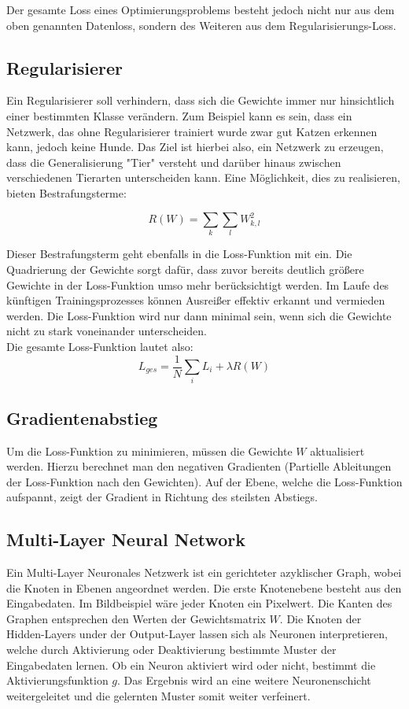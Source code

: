 \documentclass[11pt,ceqn]{book}
\begin{document}
Der gesamte Loss eines Optimierungsproblems besteht jedoch nicht nur aus dem oben genannten Datenloss, sondern des Weiteren aus dem Regularisierungs-Loss.

\subsection{Regularisierer}
Ein Regularisierer soll verhindern, dass sich die Gewichte immer nur hinsichtlich einer bestimmten Klasse verändern. Zum Beispiel kann es sein, dass ein Netzwerk, das ohne Regularisierer trainiert wurde zwar gut Katzen erkennen kann, jedoch keine Hunde. Das Ziel ist hierbei also, ein Netzwerk zu erzeugen, dass die Generalisierung "Tier" versteht und darüber hinaus zwischen verschiedenen Tierarten unterscheiden kann. Eine Möglichkeit, dies zu realisieren, bieten Bestrafungsterme:

\[R(W) = \sum_{k}\sum_{l} W_{k,l}^2\]

Dieser Bestrafungsterm geht ebenfalls in die Loss-Funktion mit ein. Die Quadrierung der Gewichte sorgt dafür, dass zuvor bereits deutlich größere Gewichte in der Loss-Funktion umso mehr berücksichtigt werden. Im Laufe des künftigen Trainingsprozesses können Ausreißer effektiv erkannt und vermieden werden. Die Loss-Funktion wird nur dann minimal sein, wenn sich die Gewichte nicht zu stark voneinander unterscheiden.
\\
Die gesamte Loss-Funktion lautet also:
\[L_{ges} = \frac{1}{N} \sum_{i} L_i + \lambda R(W)\]

\subsection{Gradientenabstieg}
Um die Loss-Funktion zu minimieren, müssen die Gewichte $W$ aktualisiert werden. Hierzu berechnet man den negativen Gradienten (Partielle Ableitungen der Loss-Funktion nach den Gewichten). Auf der Ebene, welche die Loss-Funktion aufspannt, zeigt der Gradient in Richtung des steilsten Abstiegs.


\subsection{Multi-Layer Neural Network}
Ein Multi-Layer Neuronales Netzwerk ist ein gerichteter azyklischer Graph, wobei die Knoten in Ebenen angeordnet werden. Die erste Knotenebene besteht aus den Eingabedaten. Im Bildbeispiel wäre jeder Knoten ein Pixelwert. Die Kanten des Graphen entsprechen den Werten der Gewichtsmatrix $W$. Die Knoten der Hidden-Layers under der Output-Layer lassen sich als Neuronen interpretieren, welche durch Aktivierung oder Deaktivierung bestimmte Muster der Eingabedaten lernen. Ob ein Neuron aktiviert wird oder nicht, bestimmt die Aktivierungsfunktion $g$. Das Ergebnis wird an eine weitere Neuronenschicht weitergeleitet und die gelernten Muster somit weiter verfeinert.
\end{document}
